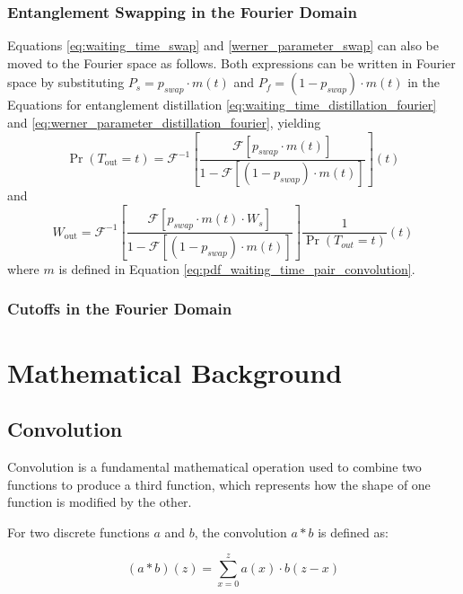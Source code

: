 \documentclass{masterthesis}
\begin{document}
\subsection*{Entanglement Swapping in the Fourier Domain}

Equations \ref{eq:waiting_time_swap} and \ref{werner_parameter_swap} can also be moved to the Fourier space as follows.
Both expressions can be written in Fourier space by substituting $P_s = p_{swap} \cdot m(t)$ and $P_f = (1 - p_{swap}) \cdot m(t)$ in the Equations for entanglement distillation \ref{eq:waiting_time_distillation_fourier} and \ref{eq:werner_parameter_distillation_fourier}, yielding
\begin{equation}
    \Pr(T_{\text{out}} = t) = \mathcal{F}^{-1} \left[ \frac{\mathcal{F}[p_{swap} \cdot m(t)]}{1 - \mathcal{F}[(1 - p_{swap}) \cdot m(t)]} \right](t)
\end{equation}
and
\begin{equation}
    W_{\text{out}} = \mathcal{F}^{-1} \left[ \frac{\mathcal{F}[p_{swap} \cdot m(t) \cdot W_s]}{1 - \mathcal{F}[(1 - p_{swap}) \cdot m(t)]} \right] \frac{1}{\Pr(T_{out}=t)}(t)
\end{equation}
where $m$ is defined in Equation \ref{eq:pdf_waiting_time_pair_convolution}.

\subsection*{Cutoffs in the Fourier Domain}

\appendix

\chapter*{Mathematical Background}

\section*{Convolution}

Convolution is a fundamental mathematical operation used to combine two functions to produce a third function, which represents how the shape of one function is modified by the other. 

For two discrete functions \(a\) and \(b\), the convolution \(a * b\) is defined as:

\begin{equation}
    (a * b)(z) = \sum_{x=0}^{z} a(x) \cdot b(z - x)
\end{equation}
\end{document}
